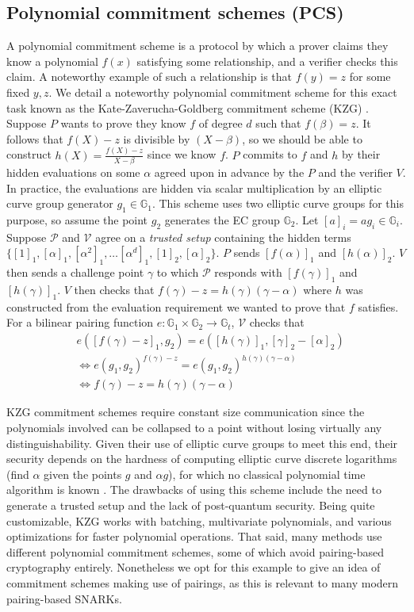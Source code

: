 \subsection{Polynomial commitment schemes (PCS)}
\noindent A polynomial commitment scheme is a protocol by which a prover claims they know a polynomial $f(x)$ satisfying some relationship, and a verifier checks this claim. A noteworthy example of such a relationship is that $f(y) = z$ for some fixed $y, z$. We detail a noteworthy polynomial commitment scheme for this exact task known as the Kate-Zaverucha-Goldberg commitment scheme (KZG) \cite{kzg}. Suppose $P$ wants to prove they know $f$ of degree $d$ such that $f(\beta) = z$. It follows that $f(X) - z$ is divisible by $(X - \beta)$, so we should be able to construct $h(X) = \frac{f(X) - z}{X - \beta}$ since we know $f$. $P$ commits to $f$ and $h$ by their hidden evaluations on some $\alpha$ agreed upon in advance by the $P$ and the verifier $V$. In practice, the evaluations are hidden via scalar multiplication by an elliptic curve group generator $g_1 \in \mathbb{G}_1$. This scheme uses two elliptic curve groups for this purpose, so assume the point $g_2$ generates the EC group $\mathbb{G}_2$. Let $[a]_i = ag_i \in \mathbb{G}_i$. Suppose $\mathcal{P}$ and $\mathcal{V}$ agree on a \textit{trusted setup} containing the hidden terms $\{[1]_1, [\alpha]_1, [\alpha^2]_1, \dots [\alpha^{d}]_1, [1]_2, [\alpha]_2\}$. $P$ sends $[f(\alpha)]_1$ and $[h(\alpha)]_2$. $V$ then sends a challenge point $\gamma$ to which $\mathcal{P}$ responds with $[f(\gamma)]_1$ and $[h(\gamma)]_1$. $V$ then checks that $f(\gamma) - z = h(\gamma)(\gamma - \alpha)$ where $h$ was constructed from the evaluation requirement we wanted to prove that $f$ satisfies. For a bilinear pairing function $e : \mathbb{G}_1 \times \mathbb{G}_2 \to \mathbb{G}_t$, $\mathcal{V}$ checks that 
\begin{align}
&e([f(\gamma) - z]_1, g_2) = e([h(\gamma)]_1, [\gamma]_2 - [\alpha]_2) \\
&\Leftrightarrow e(g_1, g_2)^{f(\gamma) - z} = e(g_1, g_2)^{h(\gamma)(\gamma - \alpha)} \\
&\Leftrightarrow  f(\gamma) - z = h(\gamma)(\gamma - \alpha)
\end{align}

\noindent KZG commitment schemes require constant size communication since the polynomials involved can be collapsed to a point without losing virtually any distinguishability. Given their use of elliptic curve groups to meet this end, their security depends on the hardness of computing elliptic curve discrete logarithms (find $\alpha$ given the points $g$ and $\alpha g$), for which no classical polynomial time algorithm is known \cite{ecdlp}. The drawbacks of using this scheme include the need to generate a trusted setup and the lack of post-quantum security. Being quite customizable, KZG works with batching, multivariate polynomials, and various optimizations for faster polynomial operations. That said, many methods use different polynomial commitment schemes, some of which avoid pairing-based cryptography entirely. Nonetheless we opt for this example to give an idea of commitment schemes making use of pairings, as this is relevant to many modern pairing-based SNARKs.
